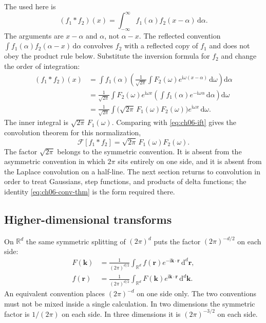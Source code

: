 The  used here is
\begin{equation}
(f_1*f_2)(x)=\int_{-\infty}^{\infty}f_1(\alpha)f_2(x-\alpha)\,\mathrm{d}\alpha.
\label{eq:ch06-convolution}
\end{equation}
The arguments are $x-\alpha$ and $\alpha$, not $\alpha-x$. The reflected convention $\int f_1(\alpha)f_2(\alpha-x)\,\mathrm{d}\alpha$ convolves $f_2$ with a reflected copy of $f_1$ and does not obey the product rule below. Substitute the inversion formula for $f_2$ and change the order of integration:
\begin{align}
(f_1*f_2)(x)
&=\int f_1(\alpha)
\left(\frac{1}{\sqrt{2\pi}}\int F_2(\omega)e^{\mathrm{i}\omega(x-\alpha)}\,\mathrm{d}\omega\right)\mathrm{d}\alpha
\nonumber\\
&=\frac{1}{\sqrt{2\pi}}\int F_2(\omega)e^{\mathrm{i}\omega x}
\left(\int f_1(\alpha)e^{-\mathrm{i}\omega\alpha}\,\mathrm{d}\alpha\right)\mathrm{d}\omega
\nonumber\\
&=\frac{1}{\sqrt{2\pi}}\int\bigl(\sqrt{2\pi}\,F_1(\omega)F_2(\omega)\bigr)e^{\mathrm{i}\omega x}\,\mathrm{d}\omega.
\end{align}
The inner integral is $\sqrt{2\pi}\,F_1(\omega)$. Comparing with \eqref{eq:ch06-ift} gives the convolution theorem for this normalization,
\begin{equation}
\mathcal{F}[f_1*f_2]=\sqrt{2\pi}\,F_1(\omega)F_2(\omega).
\label{eq:ch06-conv-thm}
\end{equation}
The factor $\sqrt{2\pi}$ belongs to the symmetric convention. It is absent from the asymmetric convention in which $2\pi$ sits entirely on one side, and it is absent from the Laplace convolution on a half-line. The next section returns to convolution in order to treat Gaussians, step functions, and products of delta functions; the identity \eqref{eq:ch06-conv-thm} is the form required there.

\subsection{Higher-dimensional transforms}

On $\mathbb{R}^d$ the same symmetric splitting of $(2\pi)^d$ puts the factor $(2\pi)^{-d/2}$ on each side:
\begin{align}
F(\mathbf{k})
&=\frac{1}{(2\pi)^{d/2}}
\int_{\mathbb{R}^d}f(\mathbf{r})e^{-\mathrm{i}\mathbf{k}\cdot\mathbf{r}}\,\mathrm{d}^d\mathbf{r},
\label{eq:ch06-ft-d}\\
f(\mathbf{r})
&=\frac{1}{(2\pi)^{d/2}}
\int_{\mathbb{R}^d}F(\mathbf{k})e^{\mathrm{i}\mathbf{k}\cdot\mathbf{r}}\,\mathrm{d}^d\mathbf{k}.
\end{align}
An equivalent convention places $(2\pi)^{-d}$ on one side only. The two conventions must not be mixed inside a single calculation. In two dimensions the symmetric factor is $1/(2\pi)$ on each side. In three dimensions it is $(2\pi)^{-3/2}$ on each side.

